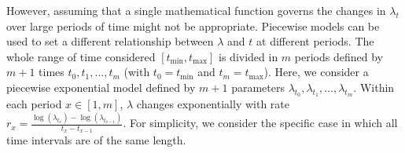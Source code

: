 \documentclass[a4paper]{article}
\begin{document}

However, assuming that a single mathematical function governs the changes in $\lambda_t$ over large periods of time might not be appropriate. Piecewise models can be used to set a different relationship between $\lambda$ and $t$ at different periods. The whole range of time considered $\left[t_{\min}, t_{\max}\right]$ is divided in $m$ periods defined  by $m + 1$  times $t_0, t_1, \dots, t_{m}$ (with $t_0 = t_{\mathrm{min}}$ and $t_{m} = t_{\mathrm{max}}$). Here, we consider a piecewise exponential model defined by $m + 1$ parameters $\lambda_{t_0},\lambda_{t_1},\dots ,\lambda_{t_{m}}$. Within each period $x\in\left[1,m\right]$, $\lambda$ changes exponentially with rate $r_x=\frac{\log\left(\lambda_{t_x}\right)-\log\left(\lambda_{t_{x-1}}\right)}{t_x-t_{x-1}}$. For simplicity, we consider the specific case in which all time intervals are of the same length.
\\
\end{document}
